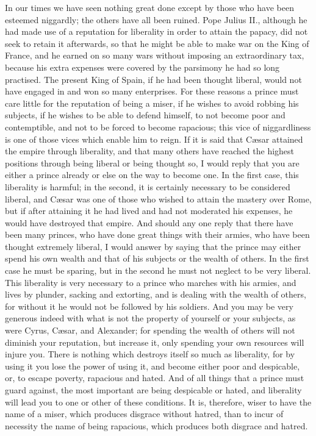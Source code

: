 \documentclass[12pt,letterpaper]{memoir}
\begin{document}
In our times we have seen nothing great done except by those who have
been esteemed niggardly; the others have all been ruined. Pope Julius
II., although he had made use of a reputation for liberality in order
to attain the papacy, did not seek to retain it afterwards, so that
he might be able to make war on the King of France, and he earned on
so many wars without imposing an extraordinary tax, because his extra
expenses were covered by the parsimony he had so long practised. The
present King of Spain, if he had been thought liberal, would not have
engaged in and won so many enterprises. For these reasons a prince must
care little for the reputation of being a miser, if he wishes to avoid
robbing his subjects, if he wishes to be able to defend himself, to not
become poor and contemptible, and not to be forced to become rapacious;
this vice of niggardliness is one of those vices which enable him to
reign. If it is said that Cæsar attained the empire through liberality,
and that many others have reached the highest positions through being
liberal or being thought so, I would reply that you are either a prince
already or else on the way to become one. In the first case, this
liberality is harmful; in the second, it is certainly necessary to be
considered liberal, and Cæsar was one of those who wished to attain the
mastery over Rome, but if after attaining it he had lived and had not
moderated his expenses, he would have destroyed that empire. And should
any one reply that there have been many princes, who have done great
things with their armies, who have been thought extremely liberal, I
would answer by saying that the prince may either spend his own wealth
and that of his subjects or the wealth of others. In the first case
he must be sparing, but in the second he must not neglect to be very
liberal. This liberality is very necessary to a prince who marches with
his armies, and lives by plunder, sacking and extorting, and is dealing
with the wealth of others, for without it he would not be followed
by his soldiers. And you may be very generous indeed with what is
not the property of yourself or your subjects, as were Cyrus, Cæsar,
and Alexander; for spending the wealth of others will not diminish
your reputation, but increase it, only spending your own resources
will injure you. There is nothing which destroys itself so much as
liberality, for by using it you lose the power of using it, and become
either poor and despicable, or, to escape poverty, rapacious and hated.
And of all things that a prince must guard against, the most important
are being despicable or hated, and liberality will lead you to one or
other of these conditions. It is, therefore, wiser to have the name
of a miser, which produces disgrace without hatred, than to incur of
necessity the name of being rapacious, which produces both disgrace and
hatred.
\end{document}
